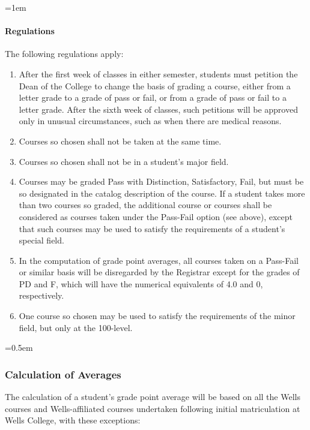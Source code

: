 \documentclass{manual}
\newcommand{\modified}[1]{}
\newcommand{\oldbreak}[1]{}
\let\oldsubsubsection\subsubsection
\renewcommand\subsubsection{\leftskip=0.5em\oldsubsubsection}
\let\oldparagraph\paragraph
\renewcommand\paragraph{\leftskip=1em\oldparagraph}
\newcommand{\editRemove}[1]{}
\newcommand{\their}{(pronoun)~ }
\newcommand{\itemLevelA}{\alph*.}
\newcommand{\itemRefA}{\alph*}
\begin{document}
\paragraph{Regulations}
The following regulations apply:

\begin{enumerate}[label=\itemLevelA,ref=\itemRefA]
\item After the first week of classes in either semester, students must petition the Dean of the College to change the basis of grading a course, either from a letter grade to a grade of pass or fail, or from a grade of pass or fail to a letter grade. After the sixth week of classes, such petitions will be approved only in unusual circumstances, such as when there are medical reasons.

\item Courses so chosen shall not be taken at the same time.

\item Courses so chosen shall not be in a student's major field.

\item Courses may be graded Pass with Distinction, Satisfactory, Fail, but must be so designated in the catalog description of the course. If a student takes more than two courses so graded, the additional course or courses shall be considered as courses taken under the Pass-Fail option (see above), except that such courses may be used to satisfy the requirements of a student's special field.

\item In the computation of grade point averages, all courses taken on a Pass-Fail or similar basis will be disregarded by the Registrar except for the grades of PD and F, which will have the numerical equivalents of 4.0 and 0, respectively.

\item One course so chosen may be used to satisfy the requirements of the minor field, but only at the 100-level.

\end{enumerate}

\oldbreak{V-4}

\subsubsection{Calculation of Averages}\modified{/24/89}

The calculation of a student's grade point average will be based on all the Wells courses and Wells-affiliated courses undertaken following \editRemove{\their} initial matriculation at Wells College, with these exceptions:
\end{document}
